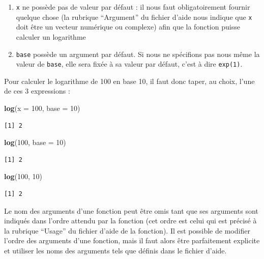 \documentclass[
  a4paper,
]{article}
\newenvironment{Shaded}{\begin{snugshade}}{\end{snugshade}}
\newcommand{\DataTypeTok}[1]{\textcolor[rgb]{0.00,0.34,0.68}{#1}}
\newcommand{\DecValTok}[1]{\textcolor[rgb]{0.69,0.50,0.00}{#1}}
\newcommand{\KeywordTok}[1]{\textcolor[rgb]{0.12,0.11,0.11}{\textbf{#1}}}
\newcommand{\NormalTok}[1]{\textcolor[rgb]{0.12,0.11,0.11}{#1}}
\providecommand{\tightlist}{%
  \setlength{\itemsep}{0pt}\setlength{\parskip}{0pt}}
\begin{document}
\begin{enumerate}
\def\labelenumi{\arabic{enumi}.}
\tightlist
\item
  \texttt{x} ne possède pas de valeur par défaut : il nous faut obligatoirement fournir quelque chose (la rubrique ``Argument'' du fichier d'aide nous indique que \texttt{x} doit être un vecteur numérique ou complexe) afin que la fonction puisse calculer un logarithme
\item
  \texttt{base} possède un argument par défaut. Si nous ne spécifions pas nous même la valeur de \texttt{base}, elle sera fixée à sa valeur par défaut, c'est à dire \texttt{exp(1)}.
\end{enumerate}

Pour calculer le logarithme de 100 en base 10, il faut donc taper, au choix, l'une de ces 3 expressions :

\begin{Shaded}
\begin{Highlighting}[]
\KeywordTok{log}\NormalTok{(}\DataTypeTok{x =} \DecValTok{100}\NormalTok{, }\DataTypeTok{base =} \DecValTok{10}\NormalTok{)}
\end{Highlighting}
\end{Shaded}

\begin{verbatim}
[1] 2
\end{verbatim}

\begin{Shaded}
\begin{Highlighting}[]
\KeywordTok{log}\NormalTok{(}\DecValTok{100}\NormalTok{, }\DataTypeTok{base =} \DecValTok{10}\NormalTok{)}
\end{Highlighting}
\end{Shaded}

\begin{verbatim}
[1] 2
\end{verbatim}

\begin{Shaded}
\begin{Highlighting}[]
\KeywordTok{log}\NormalTok{(}\DecValTok{100}\NormalTok{, }\DecValTok{10}\NormalTok{)}
\end{Highlighting}
\end{Shaded}

\begin{verbatim}
[1] 2
\end{verbatim}

Le nom des arguments d'une fonction peut être omis tant que ses arguments sont indiqués dans l'ordre attendu par la fonction (cet ordre est celui qui est précisé à la rubrique ``Usage'' du fichier d'aide de la fonction). Il est possible de modifier l'ordre des arguments d'une fonction, mais il faut alors être parfaitement explicite et utiliser les noms des arguments tels que définis dans le fichier d'aide.
\end{document}
